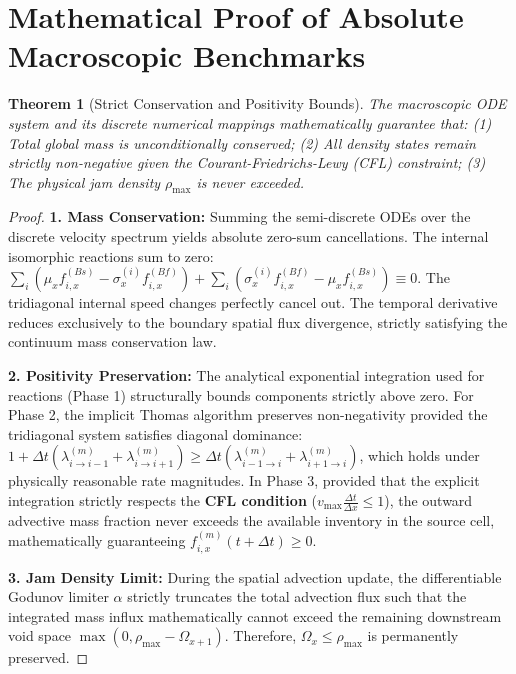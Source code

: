 \documentclass[11pt,a4paper]{article}
\newtheorem{theorem}{Theorem}
\begin{document}
\section{Mathematical Proof of Absolute Macroscopic Benchmarks}
\begin{theorem}[Strict Conservation and Positivity Bounds]
The macroscopic ODE system and its discrete numerical mappings mathematically guarantee that: (1) Total global mass is unconditionally conserved; (2) All density states remain strictly non-negative given the Courant-Friedrichs-Lewy (CFL) constraint; (3) The physical jam density $\rho_{\max}$ is never exceeded.
\end{theorem}
\begin{proof}
\textbf{1. Mass Conservation:} Summing the semi-discrete ODEs over the discrete velocity spectrum yields absolute zero-sum cancellations. The internal isomorphic reactions sum to zero: $\sum_i (\mu_x f_{i,x}^{(Bs)} - \sigma_x^{(i)} f_{i,x}^{(Bf)}) + \sum_i (\sigma_x^{(i)} f_{i,x}^{(Bf)} - \mu_x f_{i,x}^{(Bs)}) \equiv 0$. The tridiagonal internal speed changes perfectly cancel out. The temporal derivative reduces exclusively to the boundary spatial flux divergence, strictly satisfying the continuum mass conservation law.

\textbf{2. Positivity Preservation:} The analytical exponential integration used for reactions (Phase 1) structurally bounds components strictly above zero. For Phase 2, the implicit Thomas algorithm preserves non-negativity provided the tridiagonal system satisfies diagonal dominance: $1 + \Delta t(\lambda_{i\rightarrow i-1}^{(m)} + \lambda_{i\rightarrow i+1}^{(m)}) \ge \Delta t(\lambda_{i-1\rightarrow i}^{(m)} + \lambda_{i+1\rightarrow i}^{(m)})$, which holds under physically reasonable rate magnitudes. In Phase 3, provided that the explicit integration strictly respects the \textbf{CFL condition} ($v_{\max} \frac{\Delta t}{\Delta x} \le 1$), the outward advective mass fraction never exceeds the available inventory in the source cell, mathematically guaranteeing $f_{i,x}^{(m)}(t+\Delta t) \ge 0$.

\textbf{3. Jam Density Limit:} During the spatial advection update, the differentiable Godunov limiter $\alpha$ strictly truncates the total advection flux such that the integrated mass influx mathematically cannot exceed the remaining downstream void space $\max(0, \rho_{\max} - \Omega_{x+1})$. Therefore, $\Omega_x \le \rho_{\max}$ is permanently preserved.
\end{proof}
\end{document}
